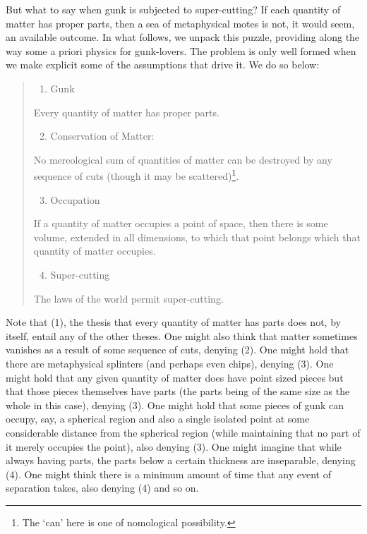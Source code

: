 But what to say when gunk is subjected to super-cutting? If each quantity of matter has proper parts, then a sea of metaphysical motes is not, it would seem, an available outcome. In what follows, we unpack this puzzle, providing along the way some a priori physics for gunk-lovers. The problem is only well formed when we make explicit some of the assumptions that drive it. We do so below:

\begin{quote}
\renewcommand{\labelenumi}{(\arabic{enumi})}
\begin{enumerate}
\item Gunk
\end{enumerate}

\noindent Every quantity of matter has proper parts.

\begin{enumerate}
\setcounter{enumi}{1}
\item Conservation of Matter: 
\end{enumerate}

\noindent No mereological sum of quantities of matter can be destroyed by any sequence of cuts (though it may be scattered)\footnote{The `can' here is one of nomological possibility.}. 

\pagebreak[2]
\begin{enumerate}
\setcounter{enumi}{2}
\item Occupation
\end{enumerate}

\noindent If a quantity of matter occupies a point of space, then there is some volume, extended in all dimensions, to which that point belongs which that quantity of matter occupies. 

\pagebreak[2]

\begin{enumerate}
\setcounter{enumi}{3}
\item Super-cutting
\end{enumerate}

\noindent The laws of the world permit super-cutting.
\end{quote}

\noindent Note that (1), the thesis that every quantity of matter has parts does not, by itself, entail any of the other theses. One might also think that matter sometimes vanishes as a result of some sequence of cuts, denying (2). One might hold that there are metaphysical splinters (and perhaps even chips), denying (3). One might hold that any given quantity of matter does have point sized pieces but that those pieces themselves have parts (the parts being of the same size as the whole in this case), denying (3). One might hold that some pieces of gunk can occupy, say, a spherical region and also a single isolated point at some considerable distance from the spherical region (while maintaining that no part of it merely occupies the point), also denying (3). One might imagine that while always having parts, the parts below a certain thickness are inseparable, denying (4). One might think there is a minimum amount of time that any event of separation takes, also denying (4) and so on. 

